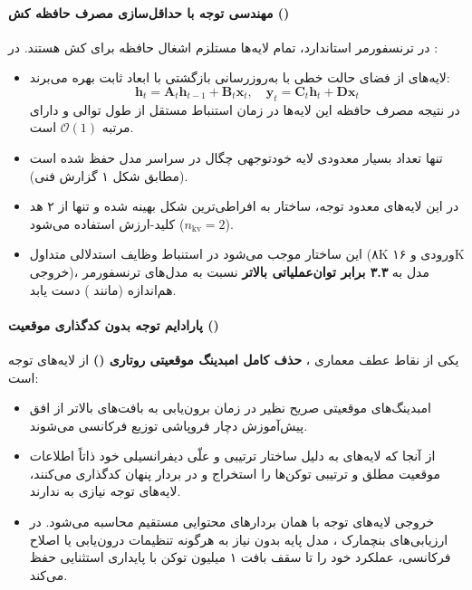 \paragraph*{مهندسی توجه با حداقل‌سازی مصرف حافظه کش ()}
در ترنسفورمر استاندارد، تمام لایه‌ها مستلزم اشغال حافظه برای کش  هستند. در :
\begin{itemize}
    \item لایه‌های  از فضای حالت خطی با به‌روزرسانی بازگشتی با ابعاد ثابت بهره می‌برند:
    \begin{equation}
        \mathbf{h}_t = \mathbf{A}_t \mathbf{h}_{t-1} + \mathbf{B}_t \mathbf{x}_t, \quad \mathbf{y}_t = \mathbf{C}_t \mathbf{h}_t + \mathbf{D} \mathbf{x}_t
    \end{equation}
    در نتیجه مصرف حافظه این لایه‌ها در زمان استنباط مستقل از طول توالی و دارای مرتبه $\mathcal{O}(1)$ است.
    \item تنها تعداد بسیار معدودی لایه خود‌توجهی چگال در سراسر مدل حفظ شده است (مطابق شکل ۱ گزارش فنی).
    \item در این لایه‌های معدود توجه، ساختار  به افراطی‌ترین شکل بهینه شده و تنها از ۲ هد کلید-ارزش استفاده می‌شود ($n_{\text{kv}} = 2$).
    \item این ساختار موجب می‌شود در استنباط وظایف استدلالی متداول (۸K ورودی و ۱۶K خروجی)، مدل  به \textbf{۳.۳ برابر توان‌عملیاتی بالاتر} نسبت به مدل‌های ترنسفورمر هم‌اندازه (مانند ) دست یابد.
\end{itemize}

\paragraph*{پارادایم توجه بدون کدگذاری موقعیت ()}
یکی از نقاط عطف معماری ، \textbf{حذف کامل امبدینگ موقعیتی روتاری ()} از لایه‌های توجه است:
\begin{itemize}
    \item امبدینگ‌های موقعیتی صریح نظیر  در زمان برون‌یابی به بافت‌های بالاتر از افق پیش‌آموزش دچار فروپاشی توزیع فرکانسی می‌شوند.
    \item از آنجا که لایه‌های  به دلیل ساختار ترتیبی و علّی دیفرانسیلی خود ذاتاً اطلاعات موقعیت مطلق و ترتیبی توکن‌ها را استخراج و در بردار پنهان کدگذاری می‌کنند، لایه‌های توجه نیازی به  ندارند.
    \item خروجی لایه‌های توجه با همان بردارهای محتوایی مستقیم محاسبه می‌شود. در ارزیابی‌های بنچمارک ، مدل پایه  بدون نیاز به هرگونه تنظیمات درون‌یابی یا اصلاح فرکانسی، عملکرد خود را تا سقف بافت ۱ میلیون توکن با پایداری استثنایی حفظ می‌کند.
\end{itemize}

